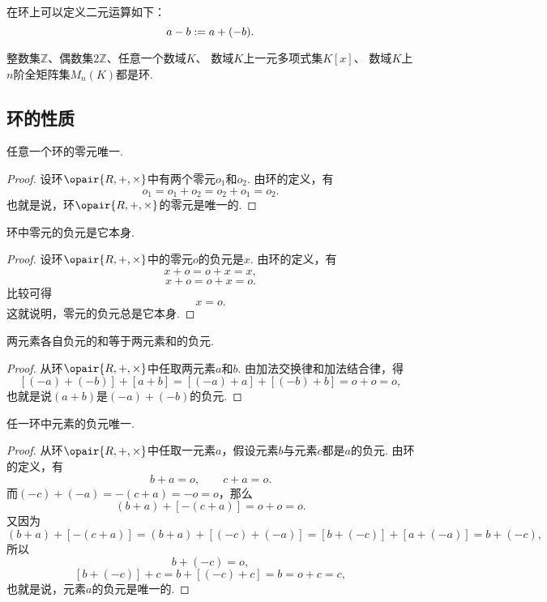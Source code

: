 在环上可以定义二元运算如下：\[
	a - b := a + (-b).
\]

\begin{example}
整数集\(\mathbb{Z}\)、偶数集\(2\mathbb{Z}\)、任意一个数域\(K\)、
数域\(K\)上一元多项式集\(K[x]\)、
数域\(K\)上\(n\)阶全矩阵集\(M_n(K)\)都是环.
\end{example}

\subsection{环的性质}
\begin{property}
任意一个环的零元唯一.
\begin{proof}
设环\(\opair{R,+,\times}\)中有两个零元\(o_1\)和\(o_2\).
由环的定义，有\[
	o_1 = o_1 + o_2 = o_2 + o_1 = o_2.
\]
也就是说，环\(\opair{R,+,\times}\)的零元是唯一的.
\end{proof}
\end{property}

\begin{property}
环中零元的负元是它本身.
\begin{proof}
设环\(\opair{R,+,\times}\)中的零元\(o\)的负元是\(x\).
由环的定义，有\[
	x + o = o + x = x,
\]\[
	x + o = o + x = o.
\]比较可得\[
	x = o.
\]
这就说明，零元的负元总是它本身.
\end{proof}
\end{property}

\begin{property}
两元素各自负元的和等于两元素和的负元.
\begin{proof}
从环\(\opair{R,+,\times}\)中任取两元素\(a\)和\(b\).
由加法交换律和加法结合律，得\[
	[(-a) + (-b)] + [a + b]
	= [(-a) + a] + [(-b) + b]
	= o + o = o,
\]
也就是说\((a+b)\)是\((-a) + (-b)\)的负元.
\end{proof}
\end{property}

\begin{property}
任一环中元素的负元唯一.
\begin{proof}
从环\(\opair{R,+,\times}\)中任取一元素\(a\)，假设元素\(b\)与元素\(c\)都是\(a\)的负元.
由环的定义，有\[
	b + a = o, \qquad
	c + a = o.
\]
而\((-c) + (-a) = -(c + a) = -o = o\)，那么\[
	(b + a) + [-(c + a)]
	= o + o = o.
\]又因为\[
	(b + a) + [-(c + a)]
	= (b + a) + [(-c) + (-a)]
	= [b + (-c)] + [a + (-a)]
	= b + (-c),
\]所以\[
	b + (-c) = o,
\]\[
	[b + (-c)] + c = b + [(-c) + c] = b = o + c = c,
\]
也就是说，元素\(a\)的负元是唯一的.
\end{proof}
\end{property}

